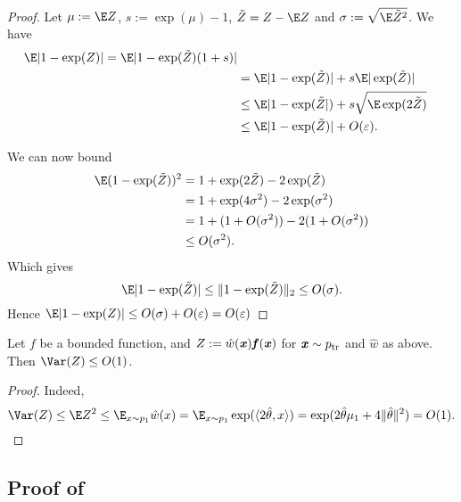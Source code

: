\begin{proof}
    Let $\mu := \E Z$, $s := \exp(\mu) - 1$, $\tilde{Z} = Z - \E Z$ and $\sigma := \sqrt{\E \tilde{Z}^2}$. We have
    \begin{align*}
        \E | 1 - \exp(Z)| = \E |1 - \exp(\tilde{Z})( 1 + s)| \\
        & = \E |1 - \exp(\tilde{Z})| + s \E |\exp(\tilde{Z})| \\
        & \leq \E | 1 - \exp(\tilde{Z}|) + s \sqrt{\E \exp(2 \tilde{Z})} \\
        & \leq \E | 1 - \exp(\tilde{Z})| + O(\varepsilon).
    \end{align*}

    We can now bound
    \begin{align*}
        \E (1 - \exp(\tilde{Z}))^2 & = 1 + \exp(2 \tilde{Z}) - 2 \exp(\tilde{Z}) \\
        & = 1 + \exp(4 \sigma^2) - 2 \exp(\sigma^2) \\
        & = 1 + (1 + O(\sigma^2)) - 2 (1 + O(\sigma^2))\\
        & \leq O(\sigma^2).
    \end{align*}
    Which gives
    \begin{equation}
        \E | 1 - \exp(\tilde{Z})| \leq \| 1 - \exp(\tilde{Z})\|_2 \leq O(\sigma).
    \end{equation}
Hence $\E | 1 - \exp(Z)| \leq O(\sigma) + O(\varepsilon) = O(\varepsilon)$

\end{proof}

\begin{lemma}
    Let $f$ be a bounded function, and $Z := \hat{w}(\boldsymbol{\mathit{x}}) \boldsymbol{\mathit{f}}(\boldsymbol{\mathit{x}})$ for $\boldsymbol{\mathit{x}} \sim p_{\mathrm{tr}}$ and $\hat{w}$ as above. Then $\Var(Z) \leq O(1)$.
\end{lemma}
\begin{proof}
    Indeed,
    \begin{equation*}
        \Var(Z) \leq \E Z^2 \leq \E_{x\sim p_1} \hat{w}(x) = \E_{x\sim p_1} \exp(\langle 2 \hat{\theta}, x\rangle) = \exp(2 \hat{\theta} \mu_1 + 4 \|\hat{\theta}\|^2) = O(1).
    \end{equation*}
\end{proof}

\subsection{Proof of~ \label{sec:rademacher-complexity-log-reg}}



